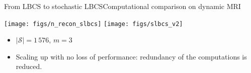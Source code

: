     \begin{frame}[t]{From LBCS to stochastic LBCS}{Computational comparison on dynamic MRI}
        \begin{minipage}{\linewidth}
            \centering
            \texttt{[image: figs/n\_recon\_slbcs]}
            \texttt{[image: figs/slbcs\_v2]}%
        \end{minipage}

        \begin{itemize}
        \item  $|\mathcal{S}|=1\,576$, $m=3$
        \vfill\item Scaling up with no loss of performance: redundancy of the computations is reduced.
        \end{itemize}
    \end{frame}

